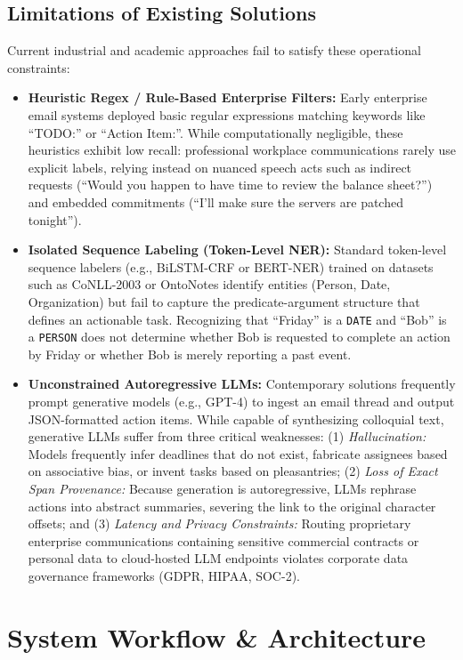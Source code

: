 \documentclass[conference]{IEEEtran}
\begin{document}
\subsection{Limitations of Existing Solutions}
Current industrial and academic approaches fail to satisfy these operational constraints:
\begin{itemize}
    \item \textbf{Heuristic Regex / Rule-Based Enterprise Filters:} Early enterprise email systems deployed basic regular expressions matching keywords like ``TODO:'' or ``Action Item:''. While computationally negligible, these heuristics exhibit low recall: professional workplace communications rarely use explicit labels, relying instead on nuanced speech acts such as indirect requests (``Would you happen to have time to review the balance sheet?'') and embedded commitments (``I'll make sure the servers are patched tonight'').
    \item \textbf{Isolated Sequence Labeling (Token-Level NER):} Standard token-level sequence labelers (e.g., BiLSTM-CRF or BERT-NER) trained on datasets such as CoNLL-2003 or OntoNotes identify entities (Person, Date, Organization) but fail to capture the predicate-argument structure that defines an actionable task. Recognizing that ``Friday'' is a \texttt{DATE} and ``Bob'' is a \texttt{PERSON} does not determine whether Bob is requested to complete an action by Friday or whether Bob is merely reporting a past event.
    \item \textbf{Unconstrained Autoregressive LLMs:} Contemporary solutions frequently prompt generative models (e.g., GPT-4) to ingest an email thread and output JSON-formatted action items. While capable of synthesizing colloquial text, generative LLMs suffer from three critical weaknesses: (1) \textit{Hallucination:} Models frequently infer deadlines that do not exist, fabricate assignees based on associative bias, or invent tasks based on pleasantries; (2) \textit{Loss of Exact Span Provenance:} Because generation is autoregressive, LLMs rephrase actions into abstract summaries, severing the link to the original character offsets; and (3) \textit{Latency and Privacy Constraints:} Routing proprietary enterprise communications containing sensitive commercial contracts or personal data to cloud-hosted LLM endpoints violates corporate data governance frameworks (GDPR, HIPAA, SOC-2).
\end{itemize}

\section{System Workflow \& Architecture}
\end{document}
